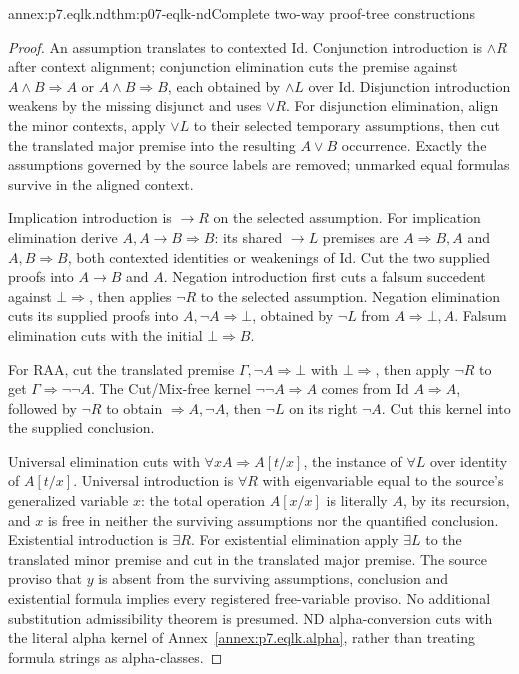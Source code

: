 \begin{annexitem}{annex:p7.eqlk.nd}{thm:p07-eqlk-nd}{Complete two-way proof-tree constructions}
\begin{proof}
An assumption translates to contexted Id. Conjunction introduction is
\(\land R\) after context alignment; conjunction elimination cuts
the premise against \(A\land B\Rightarrow A\) or
\(A\land B\Rightarrow B\), each obtained by \(\land L\) over Id.
Disjunction introduction weakens by the missing disjunct and uses
\(\lor R\). For disjunction elimination, align the minor contexts,
apply \(\lor L\) to their selected temporary assumptions, then cut
the translated major premise into the resulting \(A\lor B\) occurrence.
Exactly the assumptions governed by the source labels are removed;
unmarked equal formulas survive in the aligned context.

Implication introduction is \(\to R\) on the selected assumption.
For implication elimination derive \(A,A\to B\Rightarrow B\):
its shared \(\to L\) premises are \(A\Rightarrow B,A\) and
\(A,B\Rightarrow B\), both contexted identities or weakenings of Id.
Cut the two supplied proofs into \(A\to B\) and \(A\).
Negation introduction first cuts a falsum succedent against
\(\bot\Rightarrow\), then applies \(\neg R\) to the selected
assumption. Negation elimination cuts its supplied proofs into
\(A,\neg A\Rightarrow\bot\), obtained by \(\neg L\) from
\(A\Rightarrow\bot,A\). Falsum elimination cuts with the
initial \(\bot\Rightarrow B\).

For RAA, cut the translated premise
\(\Gamma,\neg A\Rightarrow\bot\) with \(\bot\Rightarrow\),
then apply \(\neg R\) to get \(\Gamma\Rightarrow\neg\neg A\).
The Cut/Mix-free kernel \(\neg\neg A\Rightarrow A\) comes from
Id \(A\Rightarrow A\), followed by \(\neg R\) to obtain
\(\Rightarrow A,\neg A\), then \(\neg L\) on its right
\(\neg A\). Cut this kernel into the supplied conclusion.

Universal elimination cuts with
\(\forall xA\Rightarrow A[t/x]\), the instance of \(\forall L\)
over identity of \(A[t/x]\). Universal introduction is \(\forall R\)
with eigenvariable equal to the source's generalized variable \(x\):
the total operation \(A[x/x]\) is literally \(A\), by its recursion,
and \(x\) is free in neither the surviving assumptions nor the
quantified conclusion. Existential introduction is \(\exists R\).
For existential elimination apply \(\exists L\) to the translated
minor premise and cut in the translated major premise. The source
proviso that \(y\) is absent from the surviving assumptions, conclusion
and existential formula implies every registered free-variable proviso.
No additional substitution admissibility theorem is presumed.
ND alpha-conversion cuts with the literal alpha kernel of
Annex~\ref{annex:p7.eqlk.alpha}, rather than treating formula strings
as alpha-classes.


\end{proof}
\end{annexitem}
